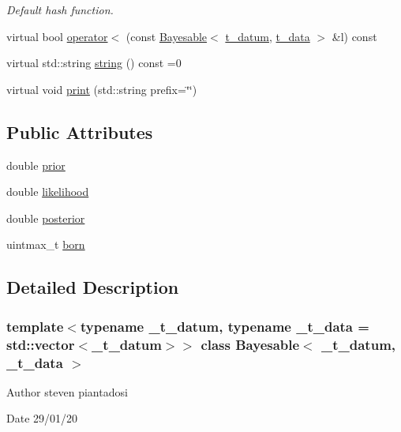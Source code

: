 \begin{DoxyCompactItemize}
\begin{DoxyCompactList}\small\item\em Default hash function. \end{DoxyCompactList}\item 
virtual bool \hyperlink{class_bayesable_aae3f461c90ffd2a4b7b3e5418cbb1054}{operator$<$} (const \hyperlink{class_bayesable}{Bayesable}$<$ \hyperlink{class_bayesable_a7c93a2eeab708378eb321745908718d4}{t\+\_\+datum}, \hyperlink{class_bayesable_a70a593a67c7d43239ecc06bb4fd06a6b}{t\+\_\+data} $>$ \&l) const
\item 
virtual std\+::string \hyperlink{class_bayesable_a2ec58e98bf37a90ac3d45a7713c6d5ea}{string} () const =0
\item 
virtual void \hyperlink{class_bayesable_a3f31fa34270083429fb23da21ad50432}{print} (std\+::string prefix=\char`\"{}\char`\"{})
\end{DoxyCompactItemize}
\subsection*{Public Attributes}
\begin{DoxyCompactItemize}
\item 
double \hyperlink{class_bayesable_ae09840f8bbd3fb92993970bc7b28dc79}{prior}
\item 
double \hyperlink{class_bayesable_ad54a4585cd8861c8002fca6f75aa92c0}{likelihood}
\item 
double \hyperlink{class_bayesable_ab27fd7227331366093ac8d47e0be1f8a}{posterior}
\item 
uintmax\+\_\+t \hyperlink{class_bayesable_a39fc0e86fa7395d8fc1ec9c8bf5dc1b5}{born}
\end{DoxyCompactItemize}


\subsection{Detailed Description}
\subsubsection*{template$<$typename \+\_\+t\+\_\+datum, typename \+\_\+t\+\_\+data = std\+::vector$<$\+\_\+t\+\_\+datum$>$$>$\newline
class Bayesable$<$ \+\_\+t\+\_\+datum, \+\_\+t\+\_\+data $>$}

\begin{DoxyAuthor}{Author}
steven piantadosi 
\end{DoxyAuthor}
\begin{DoxyDate}{Date}
29/01/20 
\end{DoxyDate}


